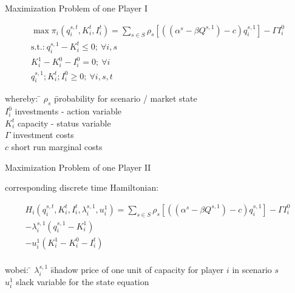 \begin{frame}{Maximization Problem of one Player I}

\begin{gather}
	\max \pi_i(q_{i}^{s,t},K_{i}^t,I_{i}^t)=
	\sum_{s\in S} \rho_s \left[ ((\alpha^s- \beta Q^{s,1}) - c) q_{i}^{s,1}  \right] - \Gamma I_{i}^{0} \label{eq:oligopmax2} \\
			\text{s.t.:} \  q_{i}^{s,1} - K_{i}^t \leq 0; \ \forall i,s \label{eq:capacitycon} \\ 
										  K^{1}_{i}  - K^{0}_{i}  - I_{i}^0 = 0 ; \ \forall i  \label{eq:state} \\
										   q_{i}^{s,1}; K^t_{i}; I_{i}^0	\geq 0; \ \forall i,s,t  \nonumber
\end{gather}

{\small
\begin{tabbing}
whereby: \= $\rho_s$ \= probability for scenario /  market state\\
\> $I_{i}^{0}$     \>   investments - action variable  \\
\> $K_{i}^t $      \>   capacity - status variable \\
\> $\Gamma$        \>   investment costs \\
\> $c$             \>   short run marginal costs \\
\end{tabbing}}
\end{frame}

\begin{frame}{Maximization Problem of one Player II}

corresponding discrete time Hamiltonian:

\begin{gather}
	 H_i(q_{i}^{s,t},K_{i}^t,I_{i}^t,\lambda_{i}^{s,1},u_{i}^1)= 
	 \sum_{s\in S} \rho_s \left[((\alpha^s- \beta Q^{s,1}) - c) q_{i}^{s,1} \right]	- \Gamma I_{i}^{0}  \\ \nonumber  
	  	- \lambda_{i}^{s,1}(q_{i}^{s,1} - K^{1}_{i}) \\ \nonumber
			- u_{i}^1(K^{1}_{i}  - K^{0}_{i}  - I_{i}^t)	\\  \nonumber
\end{gather}

{\small
\begin{tabbing}
wobei: \= $\lambda_{i}^{s,1}$ \= shadow price of one unit of capacity for player $i$ in scenario $s$\\
\> $u_{i}^1$     \>  slack variable for the state equation\\
\end{tabbing}}

\end{frame}


